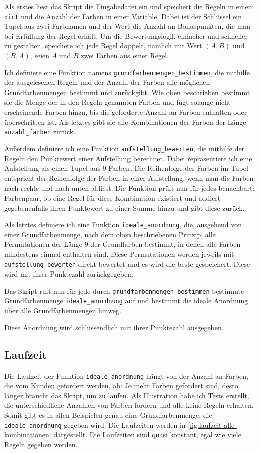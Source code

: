 \documentclass[a4paper,10pt,ngerman]{scrartcl}
\begin{document}
Als erstes liest das Skript die Eingabedatei ein und speichert die Regeln in einem \texttt{dict} und die Anzahl der Farben in einer Variable.
Dabei ist der Schlüssel ein Tupel aus zwei Farbnamen und der Wert die Anzahl an Bonuspunkten, die man bei Erfüllung der Regel erhält.
Um die Bewertungslogik einfacher und schneller zu gestalten, speichere ich jede Regel doppelt, nämlich mit Wert $(A, B)$ und $(B, A)$, seien $A$ und $B$ zwei Farben aus einer Regel.

Ich definiere eine Funktion namens \texttt{grundfarbenmengen\_bestimmen}, die mithilfe der ausgelesenen Regeln und der Anzahl der Farben alle möglichen Grundfarbenmengen bestimmt und zurückgibt.
Wie oben beschrieben bestimmt sie die Menge der in den Regeln genannten Farben und fügt solange nicht erscheinende Farben hinzu, bis die geforderte Anzahl an Farben enthalten oder überschritten ist.
Als letztes gibt sie alle Kombinationen der Farben der Länge \texttt{anzahl\_farben} zurück.

Außerdem definiere ich eine Funktion \texttt{aufstellung\_bewerten}, die mithilfe der Regeln den Punktewert einer Aufstellung berechnet.
Dabei repräsentiere ich eine Aufstellung als einen Tupel aus 9 Farben.
Die Reihenfolge der Farben im Tupel entspricht der Reihenfolge der Farben in einer Aufstellung, wenn man die Farben nach rechts und nach unten abliest.
Die Funktion prüft nun für jedes benachbarte Farbenpaar, ob eine Regel für diese Kombination existiert und addiert gegebenenfalls ihren Punktewert zu einer Summe hinzu und gibt diese zurück.

Als letztes definiere ich eine Funktion \texttt{ideale\_anordnung}, die, ausgehend von einer Grundfarbenmenge, nach dem oben beschriebenen Prinzip, alle Permutationen der Länge 9 der Grundfarben bestimmt, in denen alle Farben mindestens einmal enthalten sind.
Diese Permutationen werden jeweils mit \texttt{aufstellung\_bewerten} direkt bewertet und es wird die beste gespeichert.
Diese wird mit ihrer Punktezahl zurückgegeben.

Das Skript ruft nun für jede durch \texttt{grundfarbenmengen\_bestimmen} bestimmte Grundfarbenmenge \texttt{ideale\_anordnung} auf und bestimmt die ideale Anordnung über alle Grundfarbenmengen hinweg.

Diese Anordnung wird schlussendlich mit ihrer Punktezahl ausgegeben.

\subsection{Laufzeit}
Die Laufzeit der Funktion \texttt{ideale\_anordnung} hängt von der Anzahl an Farben, die vom Kunden gefordert werden, ab:
Je mehr Farben gefordert sind, desto länger braucht das Skript, um zu laufen.
Als Illustration habe ich Tests erstellt, die unterschiedliche Anzahlen von Farben fordern und alle keine Regeln erhalten.
Somit gibt es in allen Beispielen genau eine Grundfarbenmenge, die \texttt{ideale\_anordnung} gegeben wird.
Die Laufzeiten werden in \ref{fig:laufzeit-alle-kombinationen} dargestellt.
Die Laufzeiten sind quasi konstant, egal wie viele Regeln gegeben werden.
\end{document}

